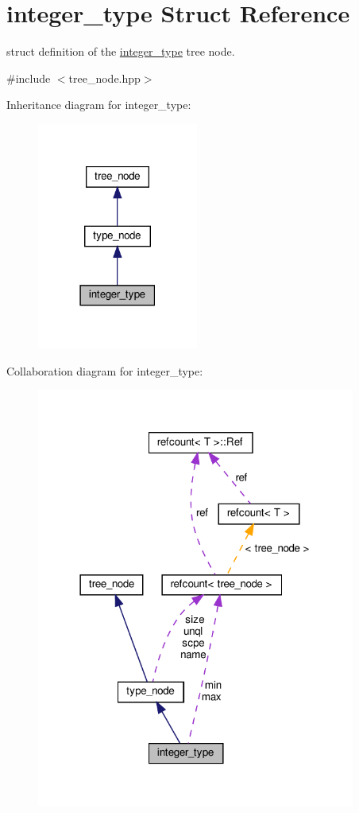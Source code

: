 \hypertarget{structinteger__type}{}\section{integer\+\_\+type Struct Reference}
\label{structinteger__type}


struct definition of the \hyperlink{structinteger__type}{integer\+\_\+type} tree node.  




{\ttfamily \#include $<$tree\+\_\+node.\+hpp$>$}



Inheritance diagram for integer\+\_\+type\+:
\nopagebreak
\begin{figure}[H]
\begin{center}
\leavevmode
\includegraphics[width=150pt]{d9/d56/structinteger__type__inherit__graph}
\end{center}
\end{figure}


Collaboration diagram for integer\+\_\+type\+:
\nopagebreak
\begin{figure}[H]
\begin{center}
\leavevmode
\includegraphics[width=297pt]{dd/dfd/structinteger__type__coll__graph}
\end{center}
\end{figure}

